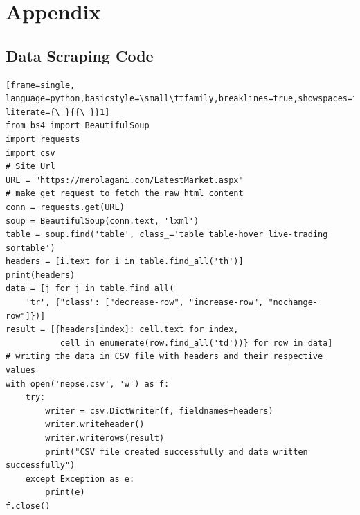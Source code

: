 \documentclass[./main.tex]{subfiles}
\begin{document}
\newpage
\chapter*{Appendix}
\section*{Data Scraping Code }
\begin{lstlisting}[frame=single, language=python,basicstyle=\small\ttfamily,breaklines=true,showspaces=false,columns=fullflexible, literate={\ }{{\ }}1]
from bs4 import BeautifulSoup
import requests
import csv
# Site Url
URL = "https://merolagani.com/LatestMarket.aspx"
# make get request to fetch the raw html content
conn = requests.get(URL)
soup = BeautifulSoup(conn.text, 'lxml')
table = soup.find('table', class_='table table-hover live-trading sortable')
headers = [i.text for i in table.find_all('th')]
print(headers)
data = [j for j in table.find_all(
    'tr', {"class": ["decrease-row", "increase-row", "nochange-row"]})]
result = [{headers[index]: cell.text for index,
           cell in enumerate(row.find_all('td'))} for row in data]
# writing the data in CSV file with headers and their respective values
with open('nepse.csv', 'w') as f:
    try:
        writer = csv.DictWriter(f, fieldnames=headers)
        writer.writeheader()
        writer.writerows(result)
        print("CSV file created successfully and data written successfully")
    except Exception as e:
        print(e)
f.close()
\end{lstlisting}
\newpage
\end{document}
